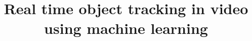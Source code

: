 \documentclass[conference]{IEEEtran}
\begin{document}

\title{
Real time object tracking in video using machine learning
}


%

\maketitle









\end{document}
